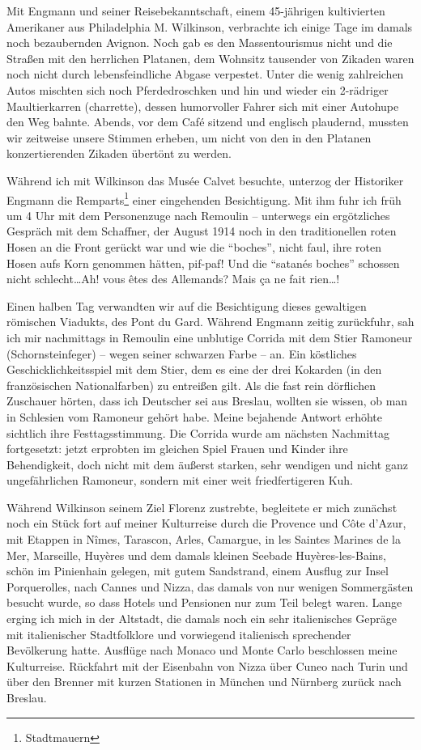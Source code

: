 Mit Engmann und seiner Reisebekanntschaft, einem 45-jährigen kultivierten Amerikaner aus Philadelphia M. Wilkinson, verbrachte ich einige Tage im damals noch bezaubernden Avignon. Noch gab es den Massentourismus nicht und die Straßen mit den herrlichen Platanen, dem Wohnsitz tausender von Zikaden waren noch nicht durch lebensfeindliche Abgase verpestet. Unter die wenig zahlreichen Autos mischten sich noch Pferdedroschken und hin und wieder ein 2-rädriger Maultierkarren (charrette), dessen humorvoller Fahrer sich mit einer Autohupe den Weg bahnte. Abends, vor dem Café sitzend und englisch plaudernd, mussten wir zeitweise unsere Stimmen erheben, um nicht von den in den Platanen konzertierenden Zikaden übertönt zu werden.

Während ich mit Wilkinson das Musée Calvet besuchte, unterzog der Historiker Engmann die Remparts\footnote{Stadtmauern} einer eingehenden Besichtigung. Mit ihm fuhr ich früh um 4 Uhr mit dem Personenzuge nach Remoulin -- unterwegs ein ergötzliches Gespräch mit dem Schaffner, der August 1914 noch in den traditionellen roten Hosen an die Front gerückt war und wie die \enquote{boches}, nicht faul, ihre roten Hosen aufs Korn genommen hätten, pif-paf! Und die \enquote{satanés boches} schossen nicht schlecht\dots Ah! vous êtes des Allemands? Mais ça ne fait rien\dots!

Einen halben Tag verwandten wir auf die Besichtigung dieses gewaltigen römischen Viadukts, des Pont du Gard. Während Engmann zeitig zurückfuhr, sah ich mir nachmittags in Remoulin eine unblutige Corrida mit dem Stier Ramoneur (Schornsteinfeger) -- wegen seiner schwarzen Farbe -- an. Ein köstliches Geschicklichkeitsspiel mit dem Stier, dem es eine der drei Kokarden (in den französischen Nationalfarben) zu entreißen gilt. Als die fast rein dörflichen Zuschauer hörten, dass ich Deutscher sei aus Breslau, wollten sie wissen, ob man in Schlesien vom Ramoneur gehört habe. Meine bejahende Antwort erhöhte sichtlich ihre Festtagsstimmung. Die Corrida wurde am nächsten Nachmittag fortgesetzt: jetzt erprobten im gleichen Spiel Frauen und Kinder ihre Behendigkeit, doch nicht mit dem äußerst starken, sehr wendigen und nicht ganz ungefährlichen Ramoneur, sondern mit einer weit friedfertigeren Kuh.

Während Wilkinson seinem Ziel Florenz zustrebte, begleitete er mich zunächst noch ein Stück fort auf meiner Kulturreise durch die Provence und Côte d'Azur, mit Etappen in Nîmes, Tarascon, Arles, Camargue, in les Saintes Marines de la Mer, Marseille, Huyères und dem damals kleinen Seebade Huyères-les-Bains, schön im Pinienhain gelegen, mit gutem Sandstrand, einem Ausflug zur Insel Porquerolles, nach Cannes und Nizza, das damals von nur wenigen Sommergästen besucht wurde, so dass Hotels und Pensionen nur zum Teil belegt waren. Lange erging ich mich in der Altstadt, die damals noch ein sehr italienisches Gepräge mit italienischer Stadtfolklore und vorwiegend italienisch sprechender Bevölkerung hatte. Ausflüge nach Monaco und Monte Carlo beschlossen meine Kulturreise. Rückfahrt mit der Eisenbahn von Nizza über Cuneo nach Turin und über den Brenner mit kurzen Stationen in München und Nürnberg zurück nach Breslau.\\

